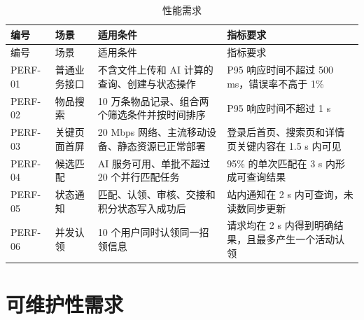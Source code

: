 \small
\begin{longtable}{L{1.5cm} L{2.6cm} L{5.2cm} L{4.8cm}}
  \caption{性能需求}\label{tab:performance}\\
  \toprule
  编号 & 场景 & 适用条件 & 指标要求 \\
  \midrule
  \endfirsthead
  \toprule
  编号 & 场景 & 适用条件 & 指标要求 \\
  \midrule
  \endhead
  PERF-01 & 普通业务接口 & 不含文件上传和 AI 计算的查询、创建与状态操作 & P95 响应时间不超过 500 ms，错误率不高于 1\% \\
  PERF-02 & 物品搜索 & 10 万条物品记录、组合两个筛选条件并按时间排序 & P95 响应时间不超过 1 s \\
  PERF-03 & 关键页面首屏 & 20 Mbps 网络、主流移动设备、静态资源已正常部署 & 登录后首页、搜索页和详情页关键内容在 1.5 s 内可见 \\
  PERF-04 & 候选匹配 & AI 服务可用、单批不超过 20 个并行匹配任务 & 95\% 的单次匹配在 3 s 内形成可查询结果 \\
  PERF-05 & 状态通知 & 匹配、认领、审核、交接和积分状态写入成功后 & 站内通知在 2 s 内可查询，未读数同步更新 \\
  PERF-06 & 并发认领 & 10 个用户同时认领同一招领信息 & 请求均在 2 s 内得到明确结果，且最多产生一个活动认领 \\
  \bottomrule
\end{longtable}
\normalsize

\section{可维护性需求}

